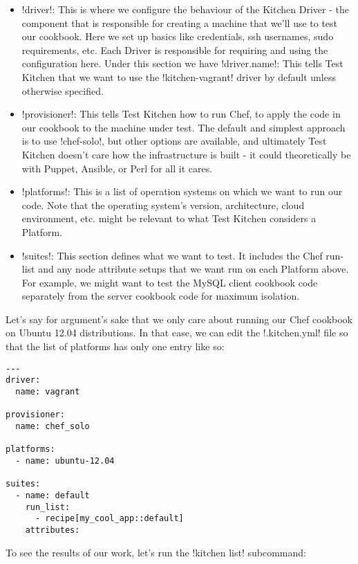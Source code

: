 \begin{itemize}
  \item \inline!driver!: This is where we configure the behaviour of the Kitchen Driver - the component that is responsible for creating a machine that we'll use to test our cookbook. Here we set up basics like credentials, ssh usernames, sudo requirements, etc. Each Driver is responsible for requiring and using the configuration here. Under this section we have \inline!driver.name!: This tells Test Kitchen that we want to use the \inline!kitchen-vagrant! driver by default unless otherwise specified.
  \item \inline!provisioner!: This tells Test Kitchen how to run Chef, to apply the code in our cookbook to the machine under test. The default and simplest approach is to use \inline!chef-solo!, but other options are available, and ultimately Test Kitchen doesn't care how the infrastructure is built - it could theoretically be with Puppet, Ansible, or Perl for all it cares.
  \item \inline!platforms!: This is a list of operation systems on which we want to run our code. Note that the operating system's version, architecture, cloud environment, etc. might be relevant to what Test Kitchen considers a Platform.
  \item \inline!suites!: This section defines what we want to test. It includes the Chef run-list and any node attribute setups that we want run on each Platform above. For example, we might want to test the MySQL client cookbook code separately from the server cookbook code for maximum isolation.
\end{itemize}

Let's say for argument's sake that we only care about running our Chef cookbook on Ubuntu 12.04 distributions. In that case, we can edit the \inline!.kitchen.yml! file so that the list of platforms has only one entry like so:

\begin{lstlisting}[label=lst:testing-test-kitchen5]
---
driver:
  name: vagrant

provisioner:
  name: chef_solo

platforms:
  - name: ubuntu-12.04

suites:
  - name: default
    run_list:
      - recipe[my_cool_app::default]
    attributes:
\end{lstlisting}

To see the results of our work, let's run the \inline!kitchen list! subcommand:

